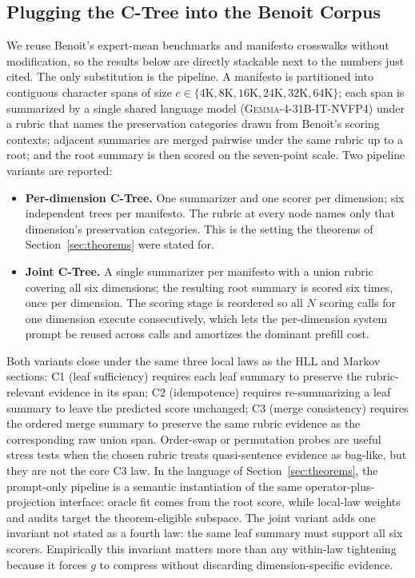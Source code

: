 \subsection{Plugging the C-Tree into the Benoit Corpus}

We reuse Benoit's expert-mean benchmarks and manifesto crosswalks
without modification, so the results below are directly stackable next
to the numbers just cited. The only substitution is the pipeline. A
manifesto is partitioned into contiguous character spans of size
$c\in\{4\mathrm{K},8\mathrm{K},16\mathrm{K},24\mathrm{K},32\mathrm{K},64\mathrm{K}\}$;
each span is summarized by a single shared language model
(\textsc{Gemma-4-31B-IT-NVFP4}) under a rubric that names the
preservation categories drawn from Benoit's scoring contexts; adjacent
summaries are merged pairwise under the same rubric up to a root;
and the root summary is then scored on the seven-point scale. Two
pipeline variants are reported:

\begin{itemize}[leftmargin=1.5em]
    \item \textbf{Per-dimension C-Tree.} One summarizer and one scorer
          per dimension; six independent trees per manifesto. The
          rubric at every node names only that dimension's preservation
          categories. This is the setting the theorems of
          Section~\ref{sec:theorems} were stated for.
    \item \textbf{Joint C-Tree.} A single summarizer per manifesto
          with a union rubric covering all six dimensions; the
          resulting root summary is scored six times, once per
          dimension. The scoring stage is reordered so all $N$
          scoring calls for one dimension execute consecutively,
          which lets the per-dimension system prompt be reused across
          calls and amortizes the dominant prefill cost.
\end{itemize}

Both variants close under the same three local laws as the HLL and
Markov sections: C1 (leaf sufficiency) requires each leaf summary to
preserve the rubric-relevant evidence in its span; C2 (idempotence)
requires re-summarizing a leaf summary to leave the predicted score
unchanged; C3 (merge consistency) requires the ordered merge summary to
preserve the same rubric evidence as the corresponding raw union span.
Order-swap or permutation probes are useful stress tests when the chosen
rubric treats quasi-sentence evidence as bag-like, but they are not the
core C3 law. In the language of Section~\ref{sec:theorems}, the prompt-only
pipeline is a semantic instantiation of the same operator-plus-projection
interface: oracle fit comes from the root score, while local-law weights
and audits target the theorem-eligible subspace. The joint variant adds
one invariant not stated as a fourth law: the same leaf summary must
support all six scorers. Empirically this invariant matters more than any
within-law tightening because it forces $g$ to compress without discarding
dimension-specific evidence.

